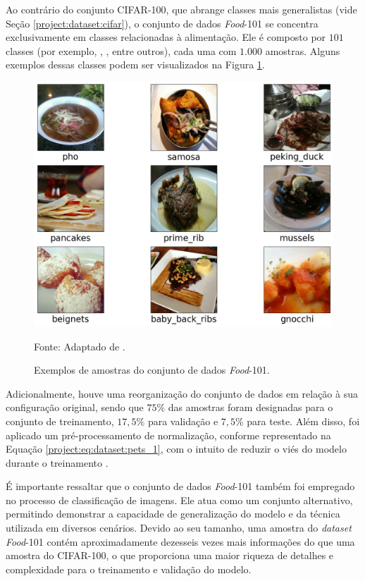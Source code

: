 Ao contrário do conjunto CIFAR-100, que abrange classes mais generalistas (vide Seção \ref{project:dataset:cifar}), o conjunto de dados \textit{Food}-101 se concentra exclusivamente em classes relacionadas à alimentação. Ele é composto por $101$ classes (por exemplo, , , entre outros), cada uma com $1.000$ amostras. Alguns exemplos dessas classes podem ser visualizados na Figura \ref{project:fig:dataset:food}.

\begin{figure}[H]
    \centering
    \caption{Exemplos de amostras do conjunto de dados \textit{Food}-101.}
    \label{project:fig:dataset:food}
    \includegraphics[width=1\textwidth]{recursos/imagens/project/food101v2.png}

    Fonte: Adaptado de \cite{Bossard2014Food-101Forests}.
\end{figure}

Adicionalmente, houve uma reorganização do conjunto de dados em relação à sua configuração original, sendo que $75\%$ das amostras foram designadas para o conjunto de treinamento, $17,5\%$ para validação e $7,5\%$ para teste. Além disso, foi aplicado um pré-processamento de normalização, conforme representado na Equação \ref{project:eq:dataset:pets_1}, com o intuito de reduzir o viés do modelo durante o treinamento \citep{Shorten2019ALearning}.

É importante ressaltar que o conjunto de dados \textit{Food}-101 também foi empregado no processo de classificação de imagens. Ele atua como um conjunto alternativo, permitindo demonstrar a capacidade de generalização do modelo e da técnica utilizada em diversos cenários. Devido ao seu tamanho, uma amostra do \textit{dataset} \textit{Food}-101 contém aproximadamente dezesseis vezes mais informações do que uma amostra do CIFAR-100, o que proporciona uma maior riqueza de detalhes e complexidade para o treinamento e validação do modelo.

